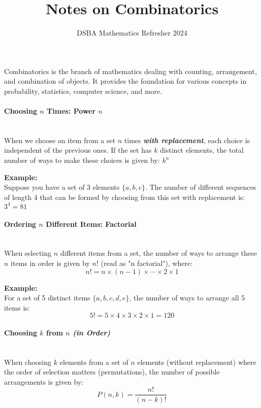 \documentclass[]{article}
\title{Notes on Combinatorics}
\author{DSBA Mathematics Refresher 2024}
\date{}
\begin{document}
	
	\maketitle
	
	\begin{abstract}
		
	\end{abstract}
	
	
	Combinatorics is the branch of mathematics dealing with counting, arrangement, and combination of objects.
	It provides the foundation for various concepts in probability, statistics, computer science, and more.
	
	\paragraph{Choosing $n$ Times: Power $n$}
	\noindent\\
	When we choose an item from a set $n$ times \textit{\textbf{with replacement}}, each choice is independent of the previous ones.
	If the set has $k$ distinct elements, the total number of ways to make these choices is given by:
	$ k^n $
	
	\textbf{Example:}
	\noindent\\
	Suppose you have a set of 3 elements $\{a, b, c\}$.
	The number of different sequences of length 4 that can be formed by choosing from this set with replacement is:
	$ 3^4 = 81 $
	
	\paragraph{Ordering $n$ Different Items: Factorial}
	\noindent\\
	When selecting $n$ different items from a set, the number of ways to arrange these $n$ items in order is given by $n!$ (read as "n factorial"), where:
	$$
	n! = n \times (n-1) \times \cdots \times 2 \times 1
	$$
	
	\textbf{Example:}
	\noindent\\
	For a set of 5 distinct items $\{a, b, c, d, e\}$, the number of ways to arrange all 5 items is:
	$$
	5!
	= 5 \times 4 \times 3 \times 2 \times 1
	= 120
	$$
	
	\paragraph{Choosing $k$ from $n$ \textit{(in Order)}}
	\noindent\\
	When choosing $k$ elements from a set of $n$ elements (without replacement) where the order of selection matters (permutations), the number of possible arrangements is given by:
	$$
	P(n, k) = \frac{n!}{(n-k)!}
	$$
	
\end{document}
